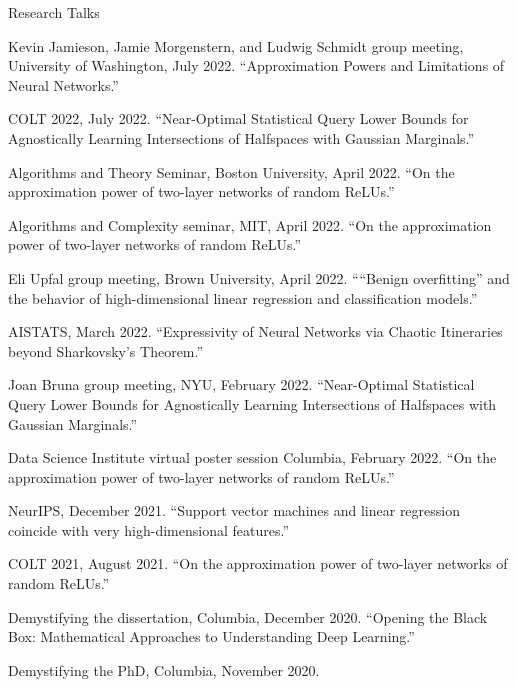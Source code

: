 \documentclass{resume} %
\begin{document}
\begin{rSection}{Research Talks}
\begin{rSubsection}{}{}{}

\item Kevin Jamieson, Jamie Morgenstern, and Ludwig Schmidt group meeting, University of Washington, July 2022. ``Approximation Powers and Limitations of Neural Networks.''
\item COLT 2022, July 2022.  ``Near-Optimal Statistical Query Lower Bounds for Agnostically Learning Intersections of Halfspaces with Gaussian Marginals.''
\item Algorithms and Theory Seminar, Boston University, April 2022. ``On the approximation power of two-layer networks of random ReLUs.'' 
\item Algorithms and Complexity seminar, MIT, April 2022. ``On the approximation power of two-layer networks of random ReLUs.'' 
\item Eli Upfal group meeting, Brown University, April 2022. ``“Benign overfitting” and the behavior of high-dimensional linear regression and classification models.''
\item AISTATS, March 2022. ``Expressivity of Neural Networks via Chaotic Itineraries beyond Sharkovsky's Theorem.'' 
\item  Joan Bruna group meeting, NYU, February 2022. ``Near-Optimal Statistical Query Lower Bounds for Agnostically Learning Intersections of Halfspaces with Gaussian Marginals.''
\item  Data Science Institute virtual poster session Columbia, February 2022. ``On the approximation power of two-layer networks of random ReLUs.''
\item  NeurIPS, December 2021. ``Support vector machines and linear regression coincide with very high-dimensional features.''
\item COLT 2021, August 2021.  ``On the approximation power of two-layer networks of random ReLUs.''
\item Demystifying the dissertation, Columbia, December 2020. ``Opening the Black Box: Mathematical Approaches to Understanding Deep Learning.''
\item Demystifying the PhD, Columbia, November 2020. 

\end{rSubsection}
\end{rSection}
\end{document}
